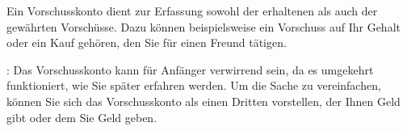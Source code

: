 Ein Vorschusskonto dient zur Erfassung sowohl der erhaltenen als auch der gewährten Vorschüsse. Dazu können beispielsweise ein Vorschuss auf Ihr Gehalt oder ein Kauf gehören, den Sie für einen Freund tätigen.

\Note{}: Das Vorschusskonto kann für Anfänger verwirrend sein, da es umgekehrt funktioniert, wie Sie später erfahren werden. Um die Sache zu vereinfachen, können Sie sich das Vorschusskonto als einen Dritten vorstellen, der Ihnen Geld gibt oder dem Sie Geld geben.


